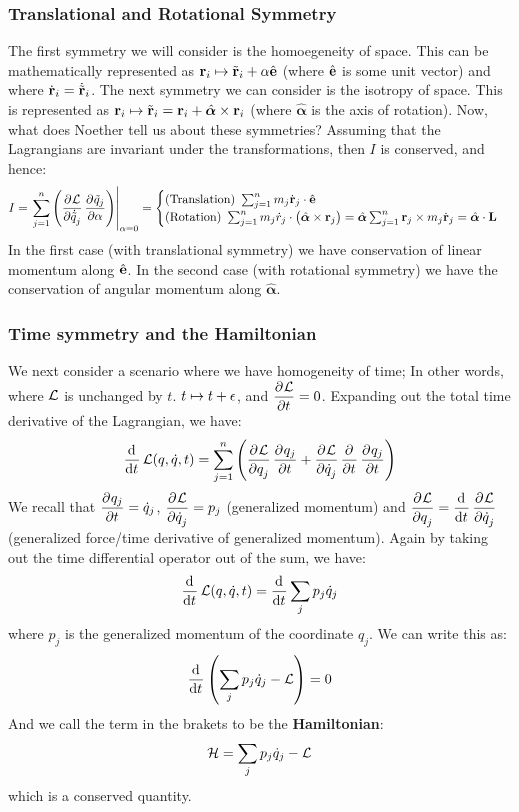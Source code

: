 \subsubsection{Translational and Rotational Symmetry}
The first symmetry we will consider is the homoegeneity of space. This can be mathematically represented as $\mathbf{r}_i \mapsto \tilde{\mathbf{r}}_i + \alpha\hat{\mathbf{e}}$ (where $\hat{\mathbf{e}}$ is some unit vector) and where $\dot{\mathbf{r}}_i = \dot{\tilde{\mathbf{r}}}_i$. 
\newline The next symmetry we can consider is the isotropy of space. This is represented as $\mathbf{r}_i \mapsto \tilde{\mathbf{r}}_i = \mathbf{r}_i + \hat{\bm{\alpha}}\times \mathbf{r}_i$ (where $\hat{\bm{\alpha}}$ is the axis of rotation). 
\newline Now, what does Noether tell us about these symmetries? Assuming that the Lagrangians are invariant under the transformations, then $I$ is conserved, and hence:
\[I = \left.\sum_{j=1}^n\left(\dpd{\LL}{\dot{\tilde{q}}_j}\dpd{\tilde{q}_j}{\alpha}\right)\right|_{\alpha=0} = \begin{cases}
\text{(Translation) } \sum_{j=1}^n m_j\dot{\v{r}}_j \cdot \ehat
\\ \text{(Rotation) } \sum_{j=1}^nm_j\dot{r}_j \cdot\left(\hat{\bm{\alpha}} \times \v{r}_j\right) = \hat{\bm{\alpha}}\sum_{j=1}^n \v{r}_j \times m_j \dot{\v{r}}_j
= \hat{\bm{\alpha}}\cdot\v{L}\end{cases}\]
In the first case (with translational symmetry) we have conservation of linear momentum along $\hat{\mathbf{e}}$. In the second case (with rotational symmetry) we have the conservation of angular momentum along $\hat{\bm{\alpha}}$.
\subsubsection{Time symmetry and the Hamiltonian}
We next consider a scenario where we have homogeneity of time; In other words, where $\mathcal{L}$ is unchanged by $t$. $t \mapsto t + \epsilon$, and $\dpd{\LL}{t} = 0$. Expanding out the total time derivative of the Lagrangian, we have:
\[\dod{}{t}\LL(q, \dot{q}, t) = \sum_{j=1}^n \left(\dpd{\LL}{q_j}\dpd{q_j}{t} + \dpd{\LL}{\dot{q}_j}\dpd{}{t}\dpd{q_j}{t}\right)\]
We recall that $\dpd{q_j}{t} = \dot{q}_j$, $\dpd{\LL}{\dot{q}_j} = p_j$ (generalized momentum) and $\dpd{\LL}{q_j} = \dod{}{t}\dpd{\LL}{\dot{q}_j}$ (generalized force/time derivative of generalized momentum). Again by taking out the time differential operator out of the sum, we have:
\[\dod{}{t}\LL(q, \dot{q}, t) = \dod{}{t}\sum_jp_j\dot{q}_j\]
where $p_j$ is the generalized momentum of the coordinate $q_j$. We can write this as:
\[\dod{}{t}\left(\sum_jp_j\dot{q}_j - \LL\right) = 0\]
And we call the term in the brakets to be the \textbf{Hamiltonian}:
\[\mathcal{H} = \sum_jp_j\dot{q}_j - \mathcal{L}\]
which is a conserved quantity.